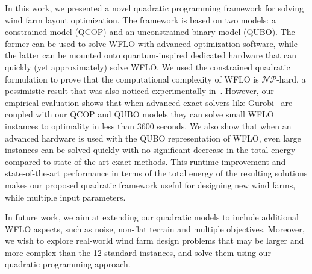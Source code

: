 \documentclass[preprint,12pt]{elsarticle}
\begin{document}
In this work, we presented a novel quadratic programming framework
for solving 
wind farm layout optimization. 
The framework is based on two models: a constrained model (QCOP) and an unconstrained binary
model (QUBO). The former can be used to solve WFLO with advanced optimization software,
while the latter can be mounted onto quantum-inspired dedicated hardware that can quickly (yet approximately) solve WFLO. We used the constrained quadratic formulation to prove 
that the computational complexity of WFLO is $\mathcal{NP}$-hard, a pessimistic result that 
was also noticed experimentally in~\cite{Zhang2014}. However,
our empirical evaluation shows that when advanced exact solvers like Gurobi~\cite{gurobi} are
coupled with our QCOP and QUBO models they can solve small WFLO instances to optimality in less than 3600 seconds.
We also show that when an advanced hardware is used with the QUBO representation of WFLO, even large instances can be solved quickly with no significant decrease in the total energy compared to state-of-the-art exact methods.
This runtime improvement and state-of-the-art performance in terms of the total energy of the resulting solutions makes our proposed quadratic framework useful for designing new wind farms, while multiple input parameters. 


In future work, we aim at extending our quadratic models to include additional 
WFLO aspects, such as noise, non-flat terrain and multiple objectives. 
Moreover, we wish to explore real-world wind farm design problems 
that may be larger and more complex than the 12 standard instances, and solve them 
using our quadratic programming approach. 


%

\end{document}
